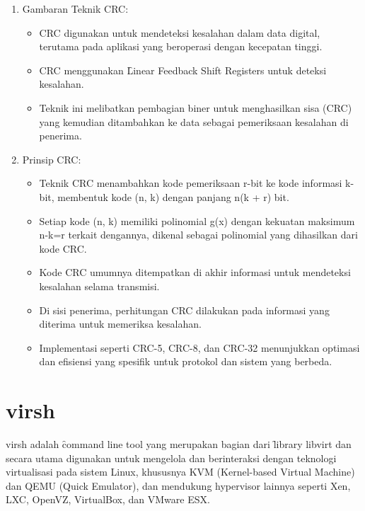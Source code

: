 \begin{enumerate}
	\item Gambaran Teknik CRC\cite{zhangLowComplexityCRC}:
	      \begin{itemize}
		      \item CRC digunakan untuk mendeteksi kesalahan dalam data digital, terutama pada aplikasi yang beroperasi dengan kecepatan tinggi.
		      \item CRC menggunakan \f{Linear Feedback Shift Registers} untuk deteksi kesalahan.
		      \item Teknik ini melibatkan pembagian biner untuk menghasilkan sisa (CRC) yang kemudian ditambahkan ke data sebagai pemeriksaan kesalahan di penerima.
	      \end{itemize}

	\item Prinsip CRC\cite{SrideviCRCDataRecovery}:
	      \begin{itemize}
		      \item Teknik CRC menambahkan kode pemeriksaan r-bit ke kode informasi k-bit, membentuk kode (n, k) dengan panjang n(k + r) bit.
		      \item Setiap kode (n, k) memiliki polinomial g(x) dengan kekuatan maksimum n-k=r terkait dengannya, dikenal sebagai polinomial yang dihasilkan dari kode CRC.
		      \item Kode CRC umumnya ditempatkan di akhir informasi untuk mendeteksi kesalahan selama transmisi.
		      \item Di sisi penerima, perhitungan CRC dilakukan pada informasi yang diterima untuk memeriksa kesalahan.
		      \item Implementasi seperti CRC-5, CRC-8, dan CRC-32 menunjukkan optimasi dan efisiensi yang spesifik untuk protokol dan sistem yang berbeda.
	      \end{itemize}
\end{enumerate}


\section{virsh}

virsh adalah \f{command line tool} yang merupakan bagian dari \f{library} libvirt dan secara utama digunakan untuk mengelola dan berinteraksi dengan teknologi virtualisasi pada sistem Linux, khususnya KVM (Kernel-based Virtual Machine) dan QEMU (Quick Emulator), dan mendukung hypervisor lainnya seperti Xen, LXC, OpenVZ, VirtualBox, dan VMware ESX\cite{libvirtLibvirtVirsh}.

